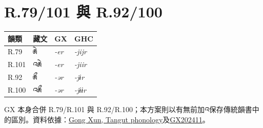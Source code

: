\documentclass[12pt]{nextart_zh}
\begin{document}
\section{R.79/101 與 R.92/100}
\begin{center}\begin{tabular}{llll}\toprule 韻類 & 藏文 & GX & GHC \\\midrule
R.79 & རྸེ & \emph{-er} & \emph{-jijr} \\ R.101 & འརྸེ & \emph{-er} & \emph{-jiir} \\ R.92 & རྸྀ & \emph{-ər} & \emph{-jɨr} \\ R.100 & འརྸྀ & \emph{-ər} & \emph{-jɨɨr} \\\bottomrule
\end{tabular}\end{center}

GX 本身合併 R.79/R.101 與 R.92/R.100；本方案則以有無前加འ保存傳統韻書中的區別。資料依據：\href{https://homepage.univie.ac.at/xun.gong/tangut/phonology-202409.html}{Gong Xun, Tangut phonology}及\href{https://semakosa.github.io/tangut-pronunciation-db/docs/GX202411-zh.html}{GX202411}。
\end{document}
